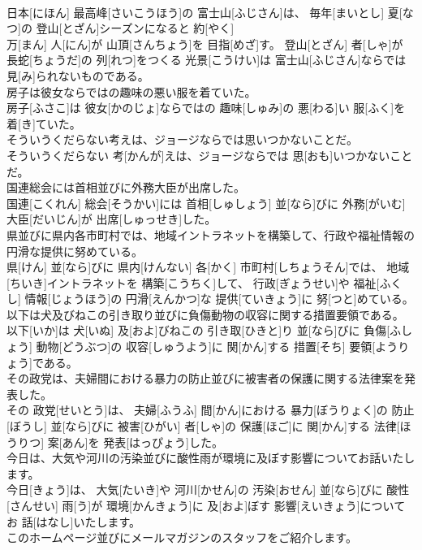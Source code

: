 \documentclass[8pt]{extreport}
\begin{document}
\begin{CJK}{UTF8}{min}
\\	日本[にほん] 最高峰[さいこうほう]の 富士山[ふじさん]は、 毎年[まいとし] 夏[なつ]の 登山[とざん]シーズンになると 約[やく] 
\\	万[まん] 人[にん]が 山頂[さんちょう]を 目指[めざ]す。 登山[とざん] 者[しゃ]が 長蛇[ちょうだ]の 列[れつ]をつくる 光景[こうけい]は 富士山[ふじさん]ならでは 見[み]られないものである。
\\	房子は彼女ならではの趣味の悪い服を着ていた。	
\\	房子[ふさこ]は 彼女[かのじょ]ならではの 趣味[しゅみ]の 悪[わる]い 服[ふく]を 着[き]ていた。
\\	そういうくだらない考えは、ジョージならでは思いつかないことだ。	
\\	そういうくだらない 考[かんが]えは、ジョージならでは 思[おも]いつかないことだ。
\\	国連総会には首相並びに外務大臣が出席した。	
\\	国連[こくれん] 総会[そうかい]には 首相[しゅしょう] 並[なら]びに 外務[がいむ] 大臣[だいじん]が 出席[しゅっせき]した。
\\	県並びに県内各市町村では、地域イントラネットを構築して、行政や福祉情報の円滑な提供に努めている。	
\\	県[けん] 並[なら]びに 県内[けんない] 各[かく] 市町村[しちょうそん]では、 地域[ちいき]イントラネットを 構築[こうちく]して、 行政[ぎょうせい]や 福祉[ふくし] 情報[じょうほう]の 円滑[えんかつ]な 提供[ていきょう]に 努[つと]めている。
\\	以下は犬及びねこの引き取り並びに負傷動物の収容に関する措置要領である。	
\\	以下[いか]は 犬[いぬ] 及[およ]びねこの 引き取[ひきと]り 並[なら]びに 負傷[ふしょう] 動物[どうぶつ]の 収容[しゅうよう]に 関[かん]する 措置[そち] 要領[ようりょう]である。
\\	その政党は、夫婦間における暴力の防止並びに被害者の保護に関する法律案を発表した。	
\\	その 政党[せいとう]は、 夫婦[ふうふ] 間[かん]における 暴力[ぼうりょく]の 防止[ぼうし] 並[なら]びに 被害[ひがい] 者[しゃ]の 保護[ほご]に 関[かん]する 法律[ほうりつ] 案[あん]を 発表[はっぴょう]した。
\\	今日は、大気や河川の汚染並びに酸性雨が環境に及ぼす影響についてお話いたします。	
\\	今日[きょう]は、 大気[たいき]や 河川[かせん]の 汚染[おせん] 並[なら]びに 酸性[さんせい] 雨[う]が 環境[かんきょう]に 及[およ]ぼす 影響[えいきょう]についてお 話[はなし]いたします。
\\	このホームページ並びにメールマガジンのスタッフをご紹介します。	

\end{CJK}
\end{document}
